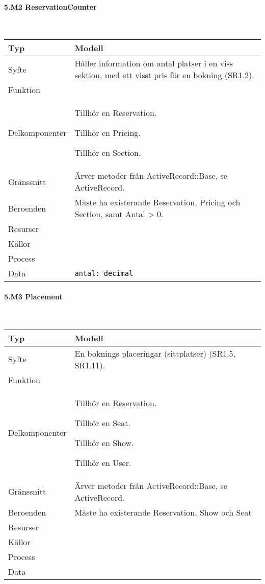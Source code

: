 \documentclass[a4paper, twoside, 11pt, titlepage]{article}
\begin{document}
			\paragraph{5.M2 ReservationCounter}\

			\begin {table} [ht] \begin{tabular} {  p{3.5cm} p{9.6cm} }
				\hline
				{Typ} & {Modell} \\
				\hline
				{Syfte} & {Håller information om antal platser i en viss sektion, med ett visst pris för en bokning (SR1.2).} \\
				\hline
				{Funktion} & { } \\
				\hline
				{Delkomponenter} & {Tillhör en Reservation.

Tillhör en Pricing.

Tillhör en Section.} \\
				\hline
				{Gränssnitt} & {Ärver metoder från ActiveRecord::Base, se ActiveRecord.} \\
				\hline
				{Beroenden} & {Måste ha existerande Reservation, Pricing och Section, samt Antal > 0.} \\
				\hline
				{Resurser} & { } \\
				\hline
				{Källor} & { } \\
				\hline
				{Process} & { } \\
				\hline
				{Data} & {{\tt antal: decimal}} \\
				\hline
			\end{tabular} \end{table} \FloatBarrier


			\paragraph{5.M3 Placement}\

			\begin {table} [ht] \begin{tabular} {  p{3.5cm} p{9.6cm} }
				\hline
				{Typ} & {Modell} \\
				\hline
				{Syfte} & {En boknings placeringar (sittplatser) (SR1.5, SR1.11).} \\
				\hline
				{Funktion} & { } \\
				\hline
				{Delkomponenter} & {Tillhör en Reservation.

Tillhör en Seat.

Tillhör en Show.

Tillhör en User.} \\
				\hline
				{Gränssnitt} & {Ärver metoder från ActiveRecord::Base, se ActiveRecord.} \\
				\hline
				{Beroenden} & {Måste ha existerande Reservation, Show och Seat} \\
				\hline
				{Resurser} & { } \\
				\hline
				{Källor} & { } \\
				\hline
				{Process} & { } \\
				\hline
				{Data} & { } \\
				\hline
			\end{tabular} \end{table} \FloatBarrier
\end{document}
